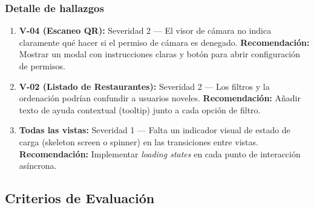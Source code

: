 \subsubsection{Detalle de hallazgos}

\begin{enumerate}
    \item \textbf{V-04 (Escaneo QR):} Severidad 2 — El visor de cámara no indica claramente qué hacer si el permiso de cámara es denegado. \textbf{Recomendación:} Mostrar un modal con instrucciones claras y botón para abrir configuración de permisos.

    \item \textbf{V-02 (Listado de Restaurantes):} Severidad 2 — Los filtros y la ordenación podrían confundir a usuarios noveles. \textbf{Recomendación:} Añadir texto de ayuda contextual (tooltip) junto a cada opción de filtro.

    \item \textbf{Todas las vistas:} Severidad 1 — Falta un indicador visual de estado de carga (skeleton screen o spinner) en las transiciones entre vistas. \textbf{Recomendación:} Implementar \textit{loading states} en cada punto de interacción asíncrona.
\end{enumerate}

\subsection{Criterios de Evaluación}

